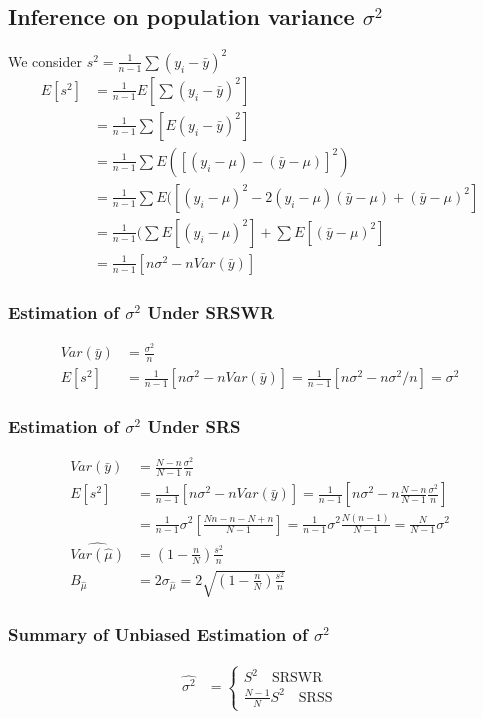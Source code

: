 \documentclass{article}
\theoremstyle{definition}
\theoremstyle{thrm}
\theoremstyle{lma}
\theoremstyle{ppst}
\theoremstyle{crlr}
\begin{document}
\subsection{Inference on population variance $\sigma^2$}
We consider $s^2 = \frac{1}{n-1}\sum(y_i-\bar{y})^2$
\begin{align*}
	E[s^2] &= \frac{1}{n-1}E[\sum(y_i-\bar{y})^2]\\
	&= \frac{1}{n-1}\sum[E(y_i-\bar{y})^2]\\
	&= \frac{1}{n-1}\sum E([(y_i-\mu)-(\bar{y}-\mu)]^2)\\
	&= \frac{1}{n-1}\sum E([(y_i-\mu)^2-2(y_i-\mu)(\bar{y}-\mu)+(\bar{y}-\mu)^2]\\
	&= \frac{1}{n-1}(\sum E[(y_i-\mu)^2]+\sum E[(\bar{y}-\mu)^2]\\
	&= \frac{1}{n-1}[n\sigma^2-nVar(\bar{y})]
\end{align*}
\subsubsection{Estimation of $\sigma^2$ Under SRSWR}
\begin{align*}
	Var(\bar{y}) &= \frac{\sigma^2}{n}\\
	E[s^2] &= \frac{1}{n-1}[n\sigma^2-nVar(\bar{y})] = \frac{1}{n-1}[n\sigma^2-n\sigma^2/n] = \sigma^2
\end{align*}
\subsubsection{Estimation of $\sigma^2$ Under SRS}
\begin{align*}
	Var(\bar{y}) &=\frac{N-n}{N-1}\frac{\sigma^2}{n}\\
	E[s^2] &= \frac{1}{n-1}[n\sigma^2-nVar(\bar{y})] = \frac{1}{n-1}[n\sigma^2-n\frac{N-n}{N-1}\frac{\sigma^2}{n}] \\
	&= \frac{1}{n-1}\sigma^2[\frac{Nn-n-N+n}{N-1}] = \frac{1}{n-1}\sigma^2\frac{N(n-1)}{N-1} = \frac{N}{N-1}\sigma^2\\
	\widehat{Var(\hat{\mu})} &= (1-\frac{n}{N})\frac{s^2}{n}\\
	B_{\hat{\mu}} &= 2\sigma_{\hat{\mu}} = 2 \sqrt{(1-\frac{n}{N})\frac{s^2}{n}}
\end{align*}
\subsubsection{Summary of Unbiased Estimation of $\sigma^2$}
\begin{align*}
	\hat{\sigma^2} &= \begin{cases}
		S^2\quad \text{SRSWR}\\
		\frac{N-1}{N}S^2 \quad \text{SRSS}
	\end{cases}
\end{align*}
\end{document}
